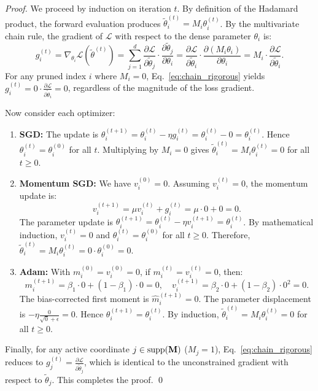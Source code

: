 \begin{proof}
We proceed by induction on iteration $t$.
By definition of the Hadamard product, the forward evaluation produces $\tilde\theta_i^{(t)} = M_i \theta_i^{(t)}$.
By the multivariate chain rule, the gradient of $\mathcal{L}$ with respect to the dense parameter $\theta_i$ is:
\begin{equation}
  g_i^{(t)} = \nabla_{\theta_i} \mathcal{L}(\tilde\theta^{(t)}) = \sum_{j=1}^d \frac{\partial \mathcal{L}}{\partial \tilde\theta_j} \cdot \frac{\partial \tilde\theta_j}{\partial \theta_i} = \frac{\partial \mathcal{L}}{\partial \tilde\theta_i} \cdot \frac{\partial (M_i \theta_i)}{\partial \theta_i} = M_i \cdot \frac{\partial \mathcal{L}}{\partial \tilde\theta_i}.
  \label{eq:chain_rigorous}
\end{equation}
For any pruned index $i$ where $M_i = 0$, Eq.~\eqref{eq:chain_rigorous} yields $g_i^{(t)} = 0 \cdot \frac{\partial \mathcal{L}}{\partial \tilde\theta_i} = 0$, regardless of the magnitude of the loss gradient.

Now consider each optimizer:
\begin{enumerate}[label=(\alph*),leftmargin=1.5em]
  \item \textbf{SGD:} The update is $\theta_i^{(t+1)} = \theta_i^{(t)} - \eta g_i^{(t)} = \theta_i^{(t)} - 0 = \theta_i^{(t)}$.
    Hence $\theta_i^{(t)} = \theta_i^{(0)}$ for all $t$.
    Multiplying by $M_i = 0$ gives $\tilde\theta_i^{(t)} = M_i \theta_i^{(t)} = 0$ for all $t \geq 0$.
  \item \textbf{Momentum SGD:} We have $v_i^{(0)} = 0$.
    Assuming $v_i^{(t)} = 0$, the momentum update is:
    \begin{equation}
      v_i^{(t+1)} = \mu v_i^{(t)} + g_i^{(t)} = \mu \cdot 0 + 0 = 0.
    \end{equation}
    The parameter update is $\theta_i^{(t+1)} = \theta_i^{(t)} - \eta v_i^{(t+1)} = \theta_i^{(t)}$.
    By mathematical induction, $v_i^{(t)} = 0$ and $\theta_i^{(t)} = \theta_i^{(0)}$ for all $t \geq 0$.
    Therefore, $\tilde\theta_i^{(t)} = M_i \theta_i^{(t)} = 0 \cdot \theta_i^{(0)} = 0$.
  \item \textbf{Adam:} With $m_i^{(0)} = v_i^{(0)} = 0$, if $m_i^{(t)} = v_i^{(t)} = 0$, then:
    \begin{equation}
      m_i^{(t+1)} = \beta_1 \cdot 0 + (1-\beta_1) \cdot 0 = 0, \quad v_i^{(t+1)} = \beta_2 \cdot 0 + (1-\beta_2) \cdot 0^2 = 0.
    \end{equation}
    The bias-corrected first moment is $\hat{m}_i^{(t+1)} = 0$.
    The parameter displacement is $-\eta \frac{0}{\sqrt{0} + \epsilon} = 0$.
    Hence $\theta_i^{(t+1)} = \theta_i^{(t)}$.
    By induction, $\tilde\theta_i^{(t)} = M_i \theta_i^{(t)} = 0$ for all $t \geq 0$.
\end{enumerate}
Finally, for any active coordinate $j \in \operatorname{supp}(\mathbf{M})$ ($M_j = 1$), Eq.~\eqref{eq:chain_rigorous} reduces to $g_j^{(t)} = \frac{\partial \mathcal{L}}{\partial \tilde\theta_j}$, which is identical to the unconstrained gradient with respect to $\tilde\theta_j$.
This completes the proof. \qed
\end{proof}

